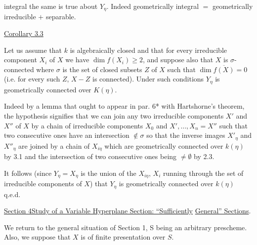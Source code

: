 
integral the same is true about $Y_\eta$.  Indeed geometrically integral
$=$ geometrically irreducible $+$ separable.

\uline{Corollary 3.3}

Let us assume that $k$ is algebraically closed and that for
every irreducible component $X_i$ of $X$ we have $\dim f(X_i) \geq 2$, and
suppose also that $X$ is $\sigma$-connected where $\sigma$ is the set of closed
subsets $Z$ of $X$ such that $\dim \overline{f(X)} = 0$ (i.e. for every such $Z$,
$X - Z$ is connected).  Under such conditions $Y_\eta$ is geometrically
connected over $K(\eta)$.

Indeed by a lemma that ought to appear in par. 6* with
Hartshorne's theorem, the hypothesis signifies that we can join
any two irreducible components $X'$ and $X''$ of $X$ by a chain of
irreducible components $X_0$ and $X',\ldots,X_n = X''$ such that two
consecutive ones have an intersection $\notin \sigma$ so that the inverse
images $X'_\eta$ and $X''_\eta$ are joined by a chain of $X_{i\eta}$ which are
geometrically connected over $k(\eta)$ by 3.1 and the intersection of
two consecutive ones being $\neq \emptyset$ by 2.3.

It follows (since $Y_\eta = X_\eta$ is the union of the $X_{i\eta}$, $X_i$ running
through the set of irreducible components of $X$) that $Y_\eta$ is
geometrically connected over $k(\eta)$ q.e.d.

\uline{Section 4}\quad \uline{Study of a Variable Hyperplane Section:  ``Sufficiently}
\uline{General'' Sections}.

We return to the general situation of Section 1, S being an
arbitrary prescheme.  Also, we suppose that $X$ is of finite
presentation over $S$.

